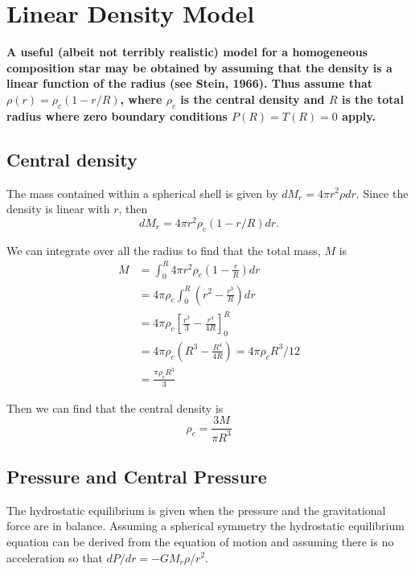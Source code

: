 \section{Linear Density Model}
\textbf{A useful (albeit not terribly realistic) model for a homogeneous composition star may be obtained by assuming that the density is a linear function of the radius (see Stein, 1966). 
Thus assume that $\rho(r)=\rho_c(1 - r/R)$, where $\rho_c$ is the central density and $R$ is the total radius where zero boundary conditions $P(R) = T(R) = 0$ apply.}

\subsection{Central density}
The mass contained within a spherical shell is given by $dM_r= 4\pi r^2\rho dr$. 
Since the density is linear with $r$, then 
\begin{equation}
    dM_r= 4\pi r^2\rho_c(1-r/R)dr.
\end{equation} 

We can integrate over all the radius to find that the total mass, $M$ is
\begin{align*}
    M&=\int^R_0 4\pi r^2\rho_c(1-\frac{r}{R})dr\\
    &=4\pi\rho_c\int^R_0\left(r^2-\frac{r^3}{R}\right)dr\\
    &=4\pi\rho_c \left[\frac{r^3}{3} -\frac{r^4}{4R}\right]^R_0\\
    &=4\pi\rho_c \left(R^3 -\frac{R^4}{4R}\right)=4\pi\rho_cR^3/12\\
    &=\frac{\pi\rho_cR^3}{3}
\end{align*}

Then we can find that the central density is
\begin{equation}
    \rho_c = \frac{3M}{\pi R^3}
    \label{eq:centralDensity}
\end{equation}


\subsection{Pressure and Central Pressure}
The hydrostatic equilibrium is given when the pressure and the gravitational force are in balance. 
Assuming a spherical symmetry the hydrostatic equilibrium equation can be derived from the equation of motion and assuming there is no acceleration so that $dP/dr = -GM_r\rho/r^2$.

